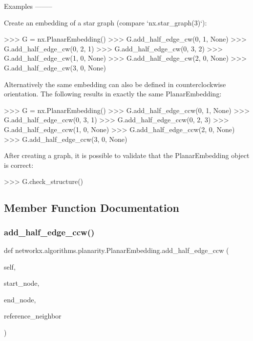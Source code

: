 \begin{DoxyVerb}
Examples
--------

Create an embedding of a star graph (compare `nx.star_graph(3)`):

>>> G = nx.PlanarEmbedding()
>>> G.add_half_edge_cw(0, 1, None)
>>> G.add_half_edge_cw(0, 2, 1)
>>> G.add_half_edge_cw(0, 3, 2)
>>> G.add_half_edge_cw(1, 0, None)
>>> G.add_half_edge_cw(2, 0, None)
>>> G.add_half_edge_cw(3, 0, None)

Alternatively the same embedding can also be defined in counterclockwise
orientation. The following results in exactly the same PlanarEmbedding:

>>> G = nx.PlanarEmbedding()
>>> G.add_half_edge_ccw(0, 1, None)
>>> G.add_half_edge_ccw(0, 3, 1)
>>> G.add_half_edge_ccw(0, 2, 3)
>>> G.add_half_edge_ccw(1, 0, None)
>>> G.add_half_edge_ccw(2, 0, None)
>>> G.add_half_edge_ccw(3, 0, None)

After creating a graph, it is possible to validate that the PlanarEmbedding
object is correct:

>>> G.check_structure()\end{DoxyVerb}
 

\subsection{Member Function Documentation}
\mbox{\label{classnetworkx_1_1algorithms_1_1planarity_1_1PlanarEmbedding_a83162c25d4361f39d128074422677ef0}} 
\subsubsection{\texorpdfstring{add\+\_\+half\+\_\+edge\+\_\+ccw()}{add\_half\_edge\_ccw()}}
{\footnotesize\ttfamily def networkx.\+algorithms.\+planarity.\+Planar\+Embedding.\+add\+\_\+half\+\_\+edge\+\_\+ccw (\begin{DoxyParamCaption}\item[{}]{self,  }\item[{}]{start\+\_\+node,  }\item[{}]{end\+\_\+node,  }\item[{}]{reference\+\_\+neighbor }\end{DoxyParamCaption})}

